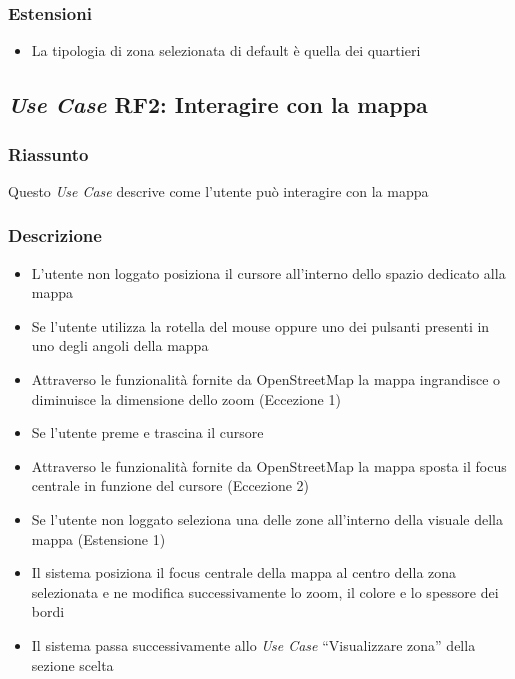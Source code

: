         \subsubsection{Estensioni}
            \begin{itemize}
                \item La tipologia di zona selezionata di default è quella dei quartieri
            \end{itemize}
    
    \subsection{\textit{Use Case} RF2: Interagire con la mappa}
        \subsubsection{Riassunto}
            Questo \textit{Use Case} descrive come l'utente può interagire con la mappa
        \subsubsection{Descrizione}
            \begin{itemize}
                \item L'utente non loggato posiziona il cursore all'interno dello spazio dedicato alla mappa
                \item Se l'utente utilizza la rotella del mouse oppure uno dei pulsanti presenti in uno degli angoli della mappa
                \item Attraverso le funzionalità fornite da OpenStreetMap la mappa ingrandisce o diminuisce la dimensione dello zoom (Eccezione 1)
                \item Se l'utente preme e trascina il cursore
                \item Attraverso le funzionalità fornite da OpenStreetMap la mappa sposta il focus centrale in funzione del cursore (Eccezione 2)
                \item Se l'utente non loggato seleziona una delle zone all'interno della visuale della mappa (Estensione 1)
                \item Il sistema posiziona il focus centrale della mappa al centro della zona selezionata e ne modifica successivamente lo zoom, il colore e lo spessore dei bordi
                \item Il sistema passa successivamente allo \textit{Use Case} ``Visualizzare zona'' della sezione scelta
            \end{itemize}
